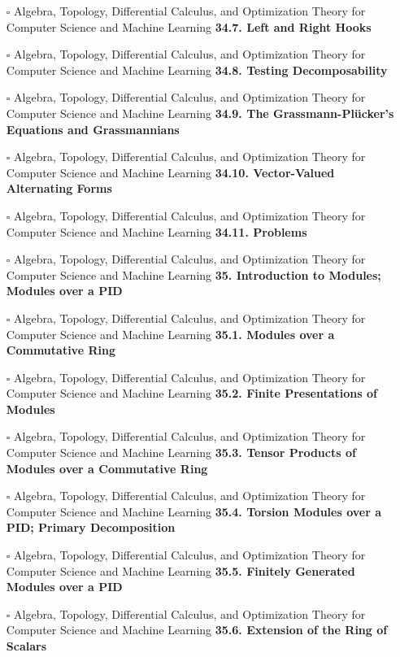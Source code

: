 \documentclass[a4, landscape, 12pt]{article}
\newcommand{\checkbox}{$\square$}%
\begin{document}
\begin{itemize}
{}
\item [\checkbox]  Algebra, Topology, Differential Calculus, and Optimization Theory for Computer Science and Machine Learning \textbf{ 34.7. Left and Right Hooks
}
\item [\checkbox]  Algebra, Topology, Differential Calculus, and Optimization Theory for Computer Science and Machine Learning \textbf{ 34.8. Testing Decomposability
}
\item [\checkbox]  Algebra, Topology, Differential Calculus, and Optimization Theory for Computer Science and Machine Learning \textbf{ 34.9. The Grassmann-Plücker’s Equations and Grassmannians
}
\item [\checkbox]  Algebra, Topology, Differential Calculus, and Optimization Theory for Computer Science and Machine Learning \textbf{ 34.10. Vector-Valued Alternating Forms
}
\item [\checkbox]  Algebra, Topology, Differential Calculus, and Optimization Theory for Computer Science and Machine Learning \textbf{ 34.11. Problems
}
\item [\checkbox]  Algebra, Topology, Differential Calculus, and Optimization Theory for Computer Science and Machine Learning \textbf{ 35. Introduction to Modules; Modules over a PID
}
\item [\checkbox]  Algebra, Topology, Differential Calculus, and Optimization Theory for Computer Science and Machine Learning \textbf{ 35.1. Modules over a Commutative Ring
}
\item [\checkbox]  Algebra, Topology, Differential Calculus, and Optimization Theory for Computer Science and Machine Learning \textbf{ 35.2. Finite Presentations of Modules
}
\item [\checkbox]  Algebra, Topology, Differential Calculus, and Optimization Theory for Computer Science and Machine Learning \textbf{ 35.3. Tensor Products of Modules over a Commutative Ring
}
\item [\checkbox]  Algebra, Topology, Differential Calculus, and Optimization Theory for Computer Science and Machine Learning \textbf{ 35.4. Torsion Modules over a PID; Primary Decomposition
}
\item [\checkbox]  Algebra, Topology, Differential Calculus, and Optimization Theory for Computer Science and Machine Learning \textbf{ 35.5. Finitely Generated Modules over a PID
}
\item [\checkbox]  Algebra, Topology, Differential Calculus, and Optimization Theory for Computer Science and Machine Learning \textbf{ 35.6. Extension of the Ring of Scalars
}
\end{itemize}
\end{document}
